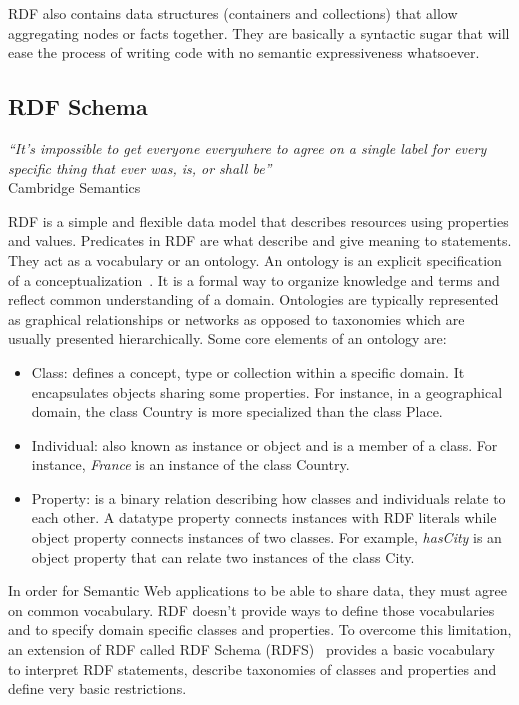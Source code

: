 RDF also contains data structures (containers and collections) that allow aggregating nodes or facts together. They are basically a syntactic sugar that will ease the process of writing code with no semantic expressiveness whatsoever.

\subsection{RDF Schema}

\begin{flushright}
	\textit{``It's impossible to get everyone everywhere to agree on a single label for every specific thing that ever was, is, or shall be''}\\
	Cambridge Semantics~\cite{Cambridge:RDF-101:13}
\end{flushright}

RDF is a simple and flexible data model that describes resources using properties and values. Predicates in RDF are what describe and give meaning to statements. They act as a vocabulary or an ontology. An ontology is an explicit specification of a conceptualization~\cite{Gruber:KA:93}. It is a formal way to organize knowledge and terms and reflect common understanding of a domain. Ontologies are typically represented as graphical relationships or networks as opposed to taxonomies which are usually presented hierarchically. Some core elements of an ontology are:

\begin{itemize}
	\item Class: defines a concept, type or collection within a specific domain. It encapsulates objects sharing some properties. For instance, in a geographical domain, the class Country is more specialized than the class Place.
	\item Individual: also known as instance or object and is a member of a class. For instance, \emph{France} is an instance of the class Country.
	\item Property: is a binary relation describing how classes and individuals relate to each other. A datatype property connects instances with RDF literals while object property connects instances of two classes. For example, \emph{hasCity} is an object property that can relate two instances of the class City.
\end{itemize}

In order for Semantic Web applications to be able to share data, they must agree on common vocabulary. RDF doesn't provide ways to define those vocabularies and to specify domain specific classes and properties. To overcome this limitation, an extension of RDF called RDF Schema (RDFS)~\cite{Brickley:RDFS:14} provides a basic vocabulary to interpret RDF statements, describe taxonomies of classes and properties and define very basic restrictions.

